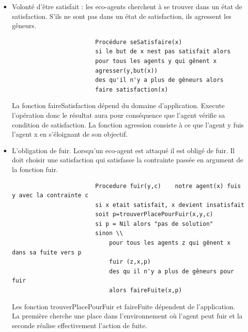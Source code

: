             \begin{itemize}
                \item  Volonté d'être satisfait : les eco-agents cherchent à se trouver dans un état de satisfaction. S'ils ne sont pas dans un état de satisfaction, ils agressent les gêneurs. \\
                    \begin{verbatim}
                        Procédure seSatisfaire(x) 
                        si le but de x nest pas satisfait alors 
                        pour tous les agents y qui gênent x 
                        agresser(y,but(x))
                        des qu'il n'y a plus de gêneurs alors 
                        faire satisfaction(x)
                    \end{verbatim}
                    La fonction faireSatisfaction dépend du domaine d'application. Execute l'opération donc le résultat aura pour conséquence que l'agent vérifie sa condition de satisfaction. La fonction agression consiste à ce que l'agent y fuis l'agent x en s'éloignant de son objectif.  
                \item L'obligation de fuir. Lorsqu'un eco-agent est attaqué il est obligé de fuir. Il doit choisir une satisfaction qui satisfasse la contrainte passée en argument de la fonction fuir. \\
                    \begin{verbatim}
                        Procedure fuir(y,c)    notre agent(x) fuis y avec la contrainte c
                        si x etait satisfait, x devient insatisfait 
                        soit p=trouverPlacePourFuir(x,y,c) 
                        si p = Nil alors "pas de solution"
                        sinon \\
                            pour tous les agents z qui gênent x dans sa fuite vers p 
                            fuir (z,x,p) 
                            des qu il n'y a plus de gêneurs pour fuir
                            alors faireFuite(x,p) 
                    \end{verbatim}    
                Les fonction trouverPlacePourFuir et faireFuite dépendent de l'application. La première cherche une place dans l'environnement où l'agent peut fuir et la seconde réalise effectivement l'action de fuite.     
            \end{itemize}
